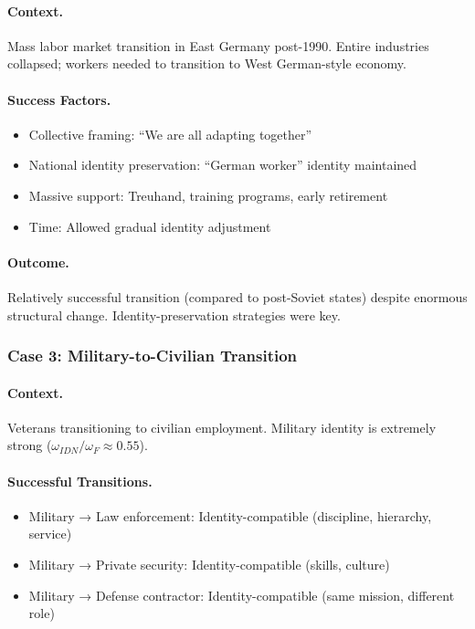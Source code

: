 \paragraph{Context.}
Mass labor market transition in East Germany post-1990. Entire industries 
collapsed; workers needed to transition to West German-style economy.

\paragraph{Success Factors.}
\begin{itemize}
    \item Collective framing: ``We are all adapting together''
    \item National identity preservation: ``German worker'' identity maintained
    \item Massive support: Treuhand, training programs, early retirement
    \item Time: Allowed gradual identity adjustment
\end{itemize}

\paragraph{Outcome.}
Relatively successful transition (compared to post-Soviet states) despite 
enormous structural change. Identity-preservation strategies were key.

\subsubsection{Case 3: Military-to-Civilian Transition}

\paragraph{Context.}
Veterans transitioning to civilian employment. Military identity is 
extremely strong ($\omega_{IDN}/\omega_F \approx 0.55$).

\paragraph{Successful Transitions.}
\begin{itemize}
    \item Military → Law enforcement: Identity-compatible (discipline, hierarchy, service)
    \item Military → Private security: Identity-compatible (skills, culture)
    \item Military → Defense contractor: Identity-compatible (same mission, different role)
\end{itemize}

